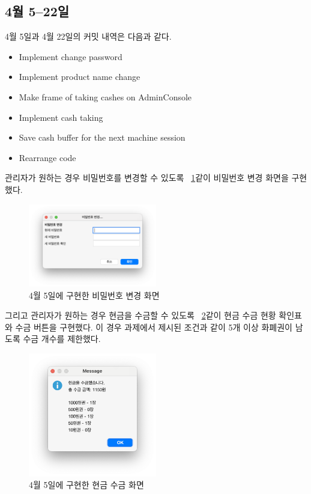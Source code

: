 \documentclass{oblivoir}
\newcommand{\figref}[1]{\figurename~\ref{#1}}
\begin{document}
    \subsection{4월 5--22일}

    4월 5일과 4월 22일의 커밋 내역은 다음과 같다.
    \begin{itemize}
        \item Implement change password
        \item Implement product name change
        \item Make frame of taking cashes on AdminConsole
        \item Implement cash taking
        \item Save cash buffer for the next machine session
        \item Rearrange code
    \end{itemize}

    관리자가 원하는 경우 비밀번호를 변경할 수 있도록 \figref{fig:0405-password-change}\와 같이 비밀번호 변경 화면을 구현했다.
    \begin{figure}[h]
        \centering
        \includegraphics[width=0.5\textwidth]{images/dev-snapshop/0405-password-change}
        \caption{4월 5일에 구현한 비밀번호 변경 화면}
        \label{fig:0405-password-change}
    \end{figure}

    그리고 관리자가 원하는 경우 현금을 수금할 수 있도록 \figref{fig:0405-cash-take}\와 같이 현금 수금 현황 확인표와 수금 버튼을 구현했다.
    이 경우 과제에서 제시된 조건과 같이 5개 이상 화폐권이 남도록 수금 개수를 제한했다.
    \begin{figure}[h]
        \centering
        \includegraphics[width=0.5\textwidth]{images/dev-snapshop/0405-cash-take}
        \caption{4월 5일에 구현한 현금 수금 화면}
        \label{fig:0405-cash-take}
    \end{figure}
\end{document}
